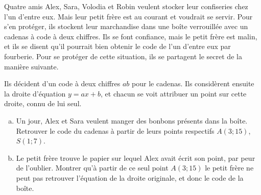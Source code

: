 \documentclass[11pt]{article}
\begin{document}
\begin{question}
  \label{ssss}
  Quatre amis Alex, Sara, Volodia et Robin veulent stocker leur confiseries chez l'un d'entre eux. Mais leur petit frère est au courant et voudrait se servir. Pour s'en protéger, ils stockent leur marchandise dans une boîte verrouillée avec un
  cadenas à code à deux chiffres. Ils se font confiance, mais le petit frère est malin, et ils se disent qu'il pourrait bien obtenir le code de l'un d'entre eux par fourberie.
  Pour se protéger de cette situation, ils se
  partagent le secret de la manière suivante.

  Ils décident d'un code à deux chiffres $ab$ pour le cadenas. Ils
  considèrent ensuite la droite d'équation $y=ax+b$, et chacun se voit
  attribuer un point sur cette droite, connu de lui seul.

  \begin{enumerate}[(a)]
    \item Un jour, Alex et Sara veulent manger des bonbons présents dans la boîte. Retrouver le code du cadenas à
      partir de leurs points respectifs $A(3; 15)$, $S(1;7)$.
    \item Le petit frère trouve le papier sur lequel Alex avait écrit son point, par peur de l'oublier. Montrer qu'à partir de ce seul point $A(3 ; 15)$ le petit frère
      ne peut pas retrouver l'équation de la droite originale, et donc le
      code de la boîte.
  \end{enumerate}
\end{question}
\end{document}
